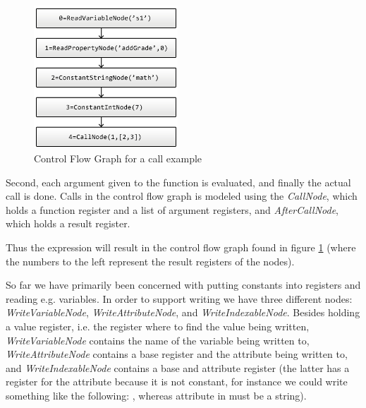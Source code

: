 \begin{figure}
	\vspace{-20pt}
	\begin{center}
		\includegraphics[width=0.48\textwidth]{images/Call-example.png}
	\end{center}
	\vspace{-10pt}
	\caption{Control Flow Graph for a call example}
	\label{fig:callCfg}
	\vspace{-10pt}
\end{figure}

Second, each argument given to the function is evaluated, and finally the actual call is done. Calls in the control flow graph is modeled using the \textit{CallNode}, which holds a function register and a list of argument registers, and \textit{AfterCallNode}, which holds a result register.

Thus the expression  will result in the control flow graph found in figure \ref{fig:callCfg} 
(where the numbers to the left represent the result registers of the nodes).

So far we have primarily been concerned with putting constants into registers and reading e.g. variables. In order to support writing we have three different nodes: \textit{WriteVariableNode}, \textit{WriteAttributeNode}, and \textit{WriteIndexableNode}. Besides holding a value register, i.e. the register where to find the value being written, \textit{WriteVariableNode} contains the name of the variable being written to, \textit{WriteAttributeNode} contains a base register and the attribute being written to, and \textit{WriteIndexableNode} contains a base and attribute register (the latter has a register for the attribute because it is not constant, for instance we could write something like the following: , whereas attribute in  must be a string).



